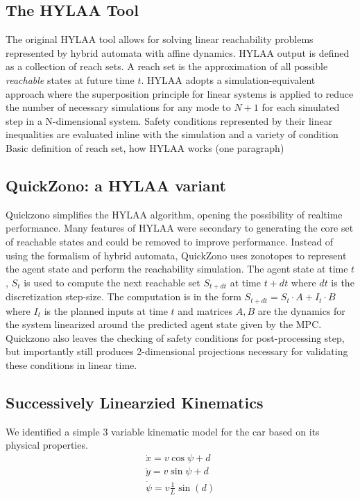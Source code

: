 \documentclass[runningheads]{llncs}
\begin{document}
\subsection{The HYLAA Tool}
The original HYLAA tool allows for solving linear reachability problems represented by hybrid automata with affine dynamics. HYLAA output is defined as a collection of reach sets. A reach set is the approximation of all possible \emph{reachable} states at future time $t$. HYLAA adopts a simulation-equivalent approach where the superposition principle for linear systems is applied to reduce the number of necessary simulations for any mode to $N+1$ for each simulated step in a N-dimensional system. Safety conditions represented by their linear inequalities are evaluated inline with the simulation and a variety of condition 
Basic definition of reach set, how HYLAA works (one paragraph)

\subsection{QuickZono: a HYLAA variant}
Quickzono simplifies the HYLAA algorithm, opening the possibility of realtime performance. Many features of HYLAA were secondary to generating the core set of reachable states and could be removed to improve performance. Instead of using the formalism of hybrid automata, QuickZono uses zonotopes to represent the agent state and perform the reachability simulation. The agent state at time $t$, $S_t$ is used to compute the next reachable set $S_{t+dt}$ at time $t + dt$ where $dt$ is the discretization step-size. The computation is in the form $S_{t+dt} = S_t \cdot A + I_t \cdot B$ where $I_t$ is the planned inputs at time $t$ and matrices $A, B$ are the dynamics for the system linearized around the predicted agent state given by the MPC. Quickzono also leaves the checking of safety conditions for post-processing step, but importantly still produces 2-dimensional projections necessary for validating these conditions in linear time.

\subsection{Successively Linearzied Kinematics}
We identified a simple 3 variable kinematic model for the car based on its physical properties.
\begin{align}
\dot{x} = v \cos{\psi + d} \\
\dot{y} = v \sin{\psi + d} \\
\dot{\psi} = v \frac{1}{L} \sin(d)
\end{align}
\end{document}
